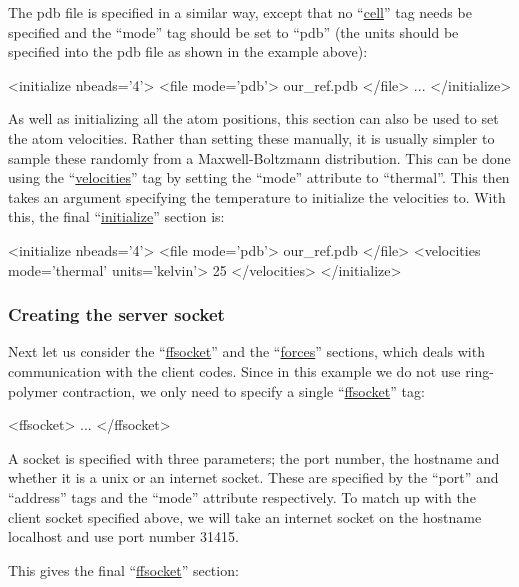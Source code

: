 \documentclass[11pt,english,fleqn]{report}
\newenvironment{code}{%
\footnotesize
\verbatim
}{
\endverbatim
\normalsize
}
\begin{document}
The pdb file is specified in a similar way, except that no
{}``\hyperref[INITCELL]{cell}''
tag needs be specified and the {}``mode'' tag should be
set to {}``pdb'' (the units should be specified into the pdb file as
shown in the example above):

\begin{code}
<initialize nbeads='4'>
   <file mode='pdb'> our_ref.pdb </file>
   ...
</initialize>
\end{code}

As well as initializing all the atom positions, this section
can also be used to set the atom velocities. Rather than setting these manually,
it is usually simpler to sample these randomly from a Maxwell-Boltzmann
distribution. This can be done using the
{}``\hyperref[INITVELOCITIES]{velocities}''
tag by setting the {}``mode'' attribute to {}``thermal''.
This then takes an argument specifying the temperature to initialize the
velocities to. With this, the final
{}``\hyperref[INITIALIZER]{initialize}'' section is:

\begin{code}
<initialize nbeads='4'>
   <file mode='pdb'> our_ref.pdb </file>
   <velocities mode='thermal' units='kelvin'> 25 </velocities>
</initialize>
\end{code}

\subsubsection{Creating the server socket}

Next let us consider the {}``\hyperref[FFSOCKET]{ffsocket}'' and the
{}``\hyperref[FORCES]{forces}'' sections, which deals with communication
with the client codes. Since in this example we do not use ring-polymer contraction,
we only need to specify a single {}``\hyperref[FFSOCKET]{ffsocket}'' tag:

\begin{code}
<ffsocket>
   ...
</ffsocket>
\end{code}

A socket is specified with three parameters; the port number, the
hostname and whether it is a unix or an internet socket.
These are specified by the {}``port'' and {}``address'' tags
and the {}``mode'' attribute respectively.
To match up with the client socket specified above,
we will take an internet socket on the hostname localhost and
use port number 31415.

This gives the final {}``\hyperref[FFSOCKET]{ffsocket}'' section:
\end{document}
